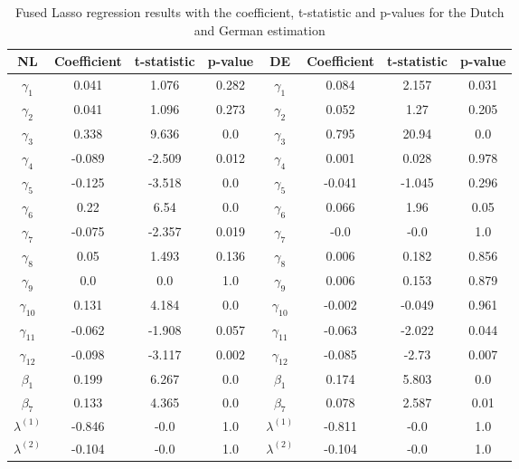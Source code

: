 \begin{table}[]
    \centering
    \begin{tabular}{|c|c c c||c|c c c|}\hline
        NL & Coefficient & t-statistic & p-value & DE & Coefficient & t-statistic & p-value\\\hline
        $\gamma_{1}$ & 0.041 & 1.076 & 0.282 & $\gamma_{1}$ & 0.084 & 2.157 & 0.031\\
        $\gamma_{2}$ & 0.041 & 1.096 & 0.273 & $\gamma_{2}$ & 0.052 & 1.27 & 0.205\\
        $\gamma_{3}$ & 0.338 & 9.636 & 0.0 & $\gamma_{3}$ & 0.795 & 20.94 & 0.0\\
        $\gamma_{4}$ & -0.089 & -2.509 & 0.012 & $\gamma_{4}$ & 0.001 & 0.028 & 0.978\\
        $\gamma_{5}$ & -0.125 & -3.518 & 0.0 & $\gamma_{5}$ & -0.041 & -1.045 & 0.296\\
        $\gamma_{6}$ & 0.22 & 6.54 & 0.0 & $\gamma_{6}$ & 0.066 & 1.96 & 0.05\\
        $\gamma_{7}$ & -0.075 & -2.357 & 0.019 & $\gamma_{7}$ & -0.0 & -0.0 & 1.0\\
        $\gamma_{8}$ & 0.05 & 1.493 & 0.136 & $\gamma_{8}$ & 0.006 & 0.182 & 0.856\\
        $\gamma_{9}$ & 0.0 & 0.0 & 1.0 & $\gamma_{9}$ & 0.006 & 0.153 & 0.879\\
        $\gamma_{10}$ & 0.131 & 4.184 & 0.0 & $\gamma_{10}$ & -0.002 & -0.049 & 0.961\\
        $\gamma_{11}$ & -0.062 & -1.908 & 0.057 & $\gamma_{11}$ & -0.063 & -2.022 & 0.044\\
        $\gamma_{12}$ & -0.098 & -3.117 & 0.002 & $\gamma_{12}$ & -0.085 & -2.73 & 0.007\\
        $\beta_{1}$ & 0.199 & 6.267 & 0.0 & $\beta_{1}$ & 0.174 & 5.803 & 0.0\\
        $\beta_{7}$ & 0.133 & 4.365 & 0.0 & $\beta_{7}$ & 0.078 & 2.587 & 0.01\\
        $\lambda^{(1)}$ & -0.846 & -0.0 & 1.0 & $\lambda^{(1)}$ & -0.811 & -0.0 & 1.0\\
        $\lambda^{(2)}$ & -0.104 & -0.0 & 1.0 & $\lambda^{(2)}$ & -0.104 & -0.0 & 1.0\\ \hline
    \end{tabular}
    \caption{Fused Lasso regression results with the coefficient, t-statistic and p-values for the Dutch and German estimation}
    \label{tab:FLASSO_estimation_results}
\end{table}
